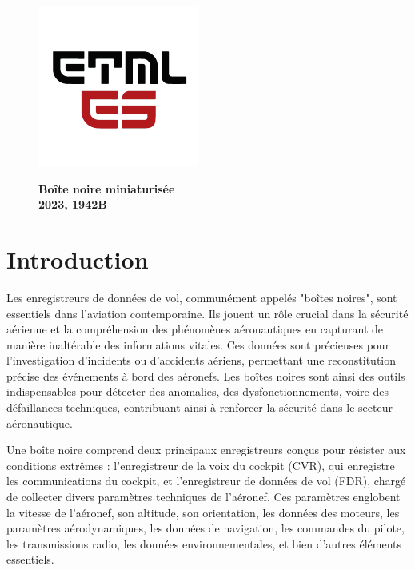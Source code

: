 \onecolumn

\begin{figure}
	\begin{minipage}{0.47\textwidth}
		\centering
		\includegraphics[width=.4\textwidth,left,]{./ETML-ES-LOGO.png}
	\end{minipage}
	\begin{minipage}{0.7\textwidth}
		\LARGE \textbf{Boîte noire miniaturisée\\ 2023, 1942B}
	\end{minipage}
\end{figure}


\section{Introduction}
Les enregistreurs de données de vol, communément appelés "boîtes noires", sont essentiels dans l'aviation contemporaine. Ils jouent un rôle crucial dans la sécurité aérienne et la compréhension des phénomènes aéronautiques en capturant de manière inaltérable des informations vitales. Ces données sont précieuses pour l'investigation d'incidents ou d'accidents aériens, permettant une reconstitution précise des événements à bord des aéronefs. Les boîtes noires sont ainsi des outils indispensables pour détecter des anomalies, des dysfonctionnements, voire des défaillances techniques, contribuant ainsi à renforcer la sécurité dans le secteur aéronautique.



Une boîte noire comprend deux principaux enregistreurs conçus pour résister aux conditions extrêmes : l'enregistreur de la voix du cockpit (CVR), qui enregistre les communications du cockpit, et l'enregistreur de données de vol (FDR), chargé de collecter divers paramètres techniques de l'aéronef. Ces paramètres englobent la vitesse de l'aéronef, son altitude, son orientation, les données des moteurs, les paramètres aérodynamiques, les données de navigation, les commandes du pilote, les transmissions radio, les données environnementales, et bien d'autres éléments essentiels.



